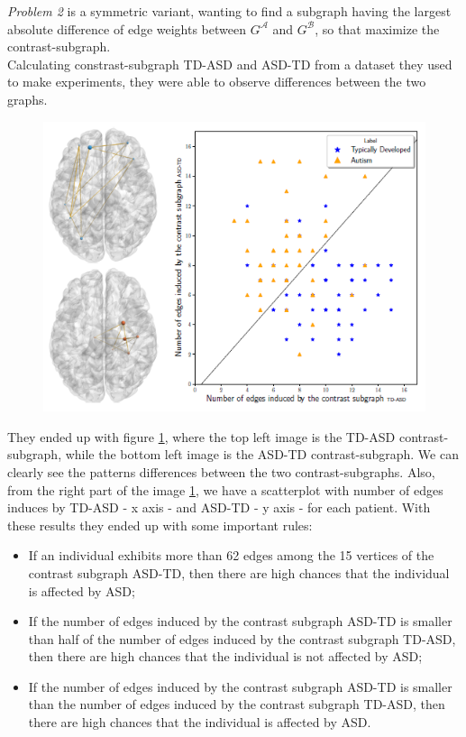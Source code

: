 \textit{Problem 2} is a symmetric variant, wanting to find a subgraph having the largest absolute difference of edge weights between $G^{\mathcal{A}}$ and $G^{\mathcal{B}}$, so that maximize the contrast-subgraph. 
\\

Calculating constrast-subgraph TD-ASD and ASD-TD from a dataset they used to make experiments, they were able to observe differences between the two graphs.
\begin{figure}[htbp]
	\centering
	\includegraphics[scale=0.8]{Immagini/c-s1.PNG}
	\caption{\label{fig:diagram6}}
\end{figure}
They ended up with figure \ref{fig:diagram6}, where the top left image is the TD-ASD contrast-subgraph, while the bottom left image is the ASD-TD contrast-subgraph. We can clearly see the patterns differences between the two contrast-subgraphs. Also, from the right part of the image \ref{fig:diagram6}, we have a scatterplot with number of edges induces by TD-ASD - x axis - and ASD-TD - y axis - for each patient. With these results they ended up with some important rules:
\begin{itemize}
	\item If an individual exhibits more than 62 edges among the 15 vertices of the contrast subgraph ASD-TD, then there are high chances that the individual is affected by ASD;
	\item If the number of edges induced by the contrast subgraph ASD-TD is smaller than half of the number of edges induced by the contrast subgraph TD-ASD, then there are high chances that the individual is not affected by ASD;
	\item If the number of edges induced by the contrast subgraph ASD-TD is smaller than the number of edges induced by the contrast subgraph TD-ASD, then there are high chances that the individual is affected by ASD.
\end{itemize}

